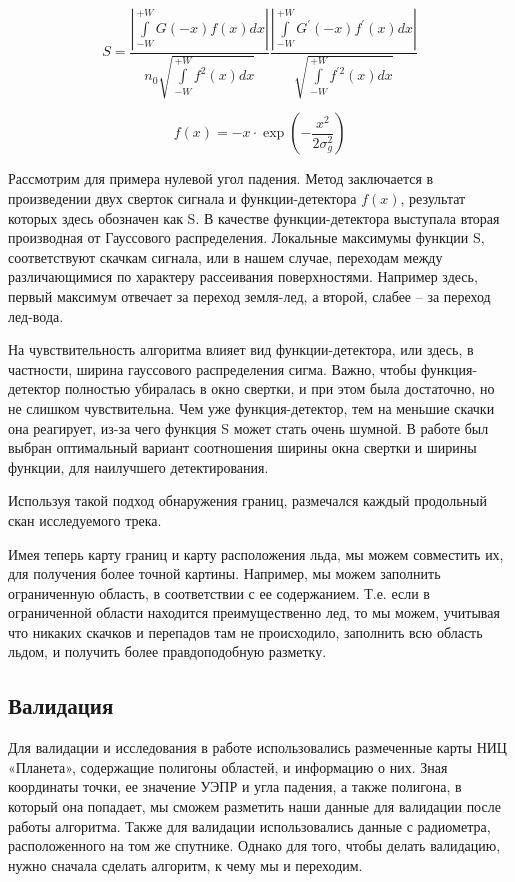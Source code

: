 \begin{equation}
  S = \frac{\left|\int \limits_{-W}^{+W} G(-x) f(x) d x\right|}{n_{0} \sqrt{\int \limits_{-W}^{+W} f^{2}(x) d x}} \frac{\left|\int \limits_{-W}^{+W} G^{\prime}(-x) f^{\prime}(x) d x\right|}{\sqrt{\int \limits_{-W}^{+W} f^{\prime 2}(x) d x}}
  \label{eq:S}
\end{equation}

\begin{equation}
  f(x) = -x\cdot \exp(-\frac{x^2}{2\sigma^2_g})
  \label{eq:fx}
\end{equation}

Рассмотрим для примера нулевой угол падения. Метод заключается в произведении двух сверток сигнала и
функции-детектора $f(x)$, результат которых здесь обозначен как S. В качестве функции-детектора выступала вторая производная от
Гауссового распределения.  Локальные максимумы функции S, соответствуют скачкам сигнала, или в нашем случае, переходам
между различающимися по характеру рассеивания поверхностями. Например здесь, первый максимум отвечает за переход
земля-лед, а второй, слабее – за переход лед-вода. 

На чувствительность алгоритма влияет вид функции-детектора, или здесь, в частности, ширина гауссового распределения
сигма. Важно, чтобы функция-детектор полностью убиралась в окно свертки, и при этом была достаточно, но не слишком
чувствительна. Чем уже функция-детектор, тем на меньшие скачки она реагирует, из-за чего функция S может стать очень
шумной. В работе был выбран оптимальный вариант соотношения ширины окна свертки и ширины функции, для наилучшего
детектирования. 

Используя такой подход обнаружения границ, размечался каждый продольный скан исследуемого трека. 

Имея теперь карту границ и карту расположения льда, мы можем совместить их, для получения более точной картины.
Например, мы можем заполнить ограниченную область, в соответствии с ее содержанием. Т.е. если в ограниченной области
находится преимущественно лед, то мы можем, учитывая что никаких скачков и перепадов там не происходило, заполнить всю
область льдом, и получить более правдоподобную разметку.

\subsection{Валидация}
Для валидации и исследования в работе использовались размеченные карты НИЦ «Планета», содержащие полигоны областей, и
информацию о них. Зная координаты точки, ее значение УЭПР и угла падения, а также полигона, в который она попадает, мы
сможем разметить наши данные для валидации после работы алгоритма. Также для валидации использовались данные с
радиометра, расположенного на том же спутнике. Однако для того, чтобы делать валидацию, нужно сначала сделать алгоритм,
к чему мы и переходим.  

